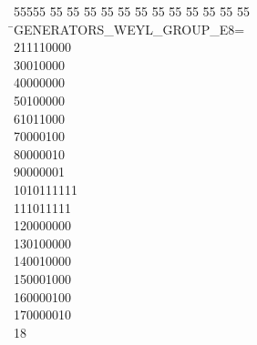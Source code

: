 %
%
\begin{tabbing}
55555 \= 55 \= 55 \= 55 \= 55 \= 55 \= 55 \= 55 \= 55 \= 55 \= 55 \= 55 \= 55 \= \>GENERATORS\_WEYL\_GROUP\_E8=\\[0pt]
2\>11110000\ \\[0pt]
30010000\ \\[0pt]
40000000\ \\[0pt]
50100000\ \\[0pt]
61011000\ \\[0pt]
70000100\ \\[0pt]
80000010\ \\[0pt]
90000001\ \\[0pt]
10\>10111111\ \\[0pt]
111011111\ \\[0pt]
120000000\ \\[0pt]
130100000\ \\[0pt]
140010000\ \\[0pt]
150001000\ \\[0pt]
160000100\ \\[0pt]
170000010\\[0pt]
18\>\end{tabbing}
